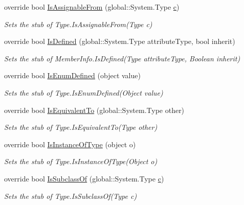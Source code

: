 \begin{DoxyCompactItemize}
override bool \hyperlink{class_system_1_1_fakes_1_1_stub_type_a411a4af33d9fb91d9b5fa7f08e66611f}{Is\-Assignable\-From} (global\-::\-System.\-Type \hyperlink{bootstrap_8min_8js_abce695e0af988ece0826d9ad59b8160d}{c})
\begin{DoxyCompactList}\small\item\em Sets the stub of Type.\-Is\-Assignable\-From(\-Type c)\end{DoxyCompactList}\item 
override bool \hyperlink{class_system_1_1_fakes_1_1_stub_type_a989561d5759c63d45a41e81c9bbef924}{Is\-Defined} (global\-::\-System.\-Type attribute\-Type, bool inherit)
\begin{DoxyCompactList}\small\item\em Sets the stub of Member\-Info.\-Is\-Defined(\-Type attribute\-Type, Boolean inherit)\end{DoxyCompactList}\item 
override bool \hyperlink{class_system_1_1_fakes_1_1_stub_type_a1fe1507d3fdd7b105894e186234adb69}{Is\-Enum\-Defined} (object value)
\begin{DoxyCompactList}\small\item\em Sets the stub of Type.\-Is\-Enum\-Defined(\-Object value)\end{DoxyCompactList}\item 
override bool \hyperlink{class_system_1_1_fakes_1_1_stub_type_aa3258ecb325236a02d95703a9f6ceef8}{Is\-Equivalent\-To} (global\-::\-System.\-Type other)
\begin{DoxyCompactList}\small\item\em Sets the stub of Type.\-Is\-Equivalent\-To(\-Type other)\end{DoxyCompactList}\item 
override bool \hyperlink{class_system_1_1_fakes_1_1_stub_type_af089ac2a4a83ed65d4bea5a44f555b47}{Is\-Instance\-Of\-Type} (object o)
\begin{DoxyCompactList}\small\item\em Sets the stub of Type.\-Is\-Instance\-Of\-Type(\-Object o)\end{DoxyCompactList}\item 
override bool \hyperlink{class_system_1_1_fakes_1_1_stub_type_ad32fb01ae824711569017335bc01786f}{Is\-Subclass\-Of} (global\-::\-System.\-Type \hyperlink{bootstrap_8min_8js_abce695e0af988ece0826d9ad59b8160d}{c})
\begin{DoxyCompactList}\small\item\em Sets the stub of Type.\-Is\-Subclass\-Of(\-Type c)\end{DoxyCompactList}\item 

\end{DoxyCompactItemize}
